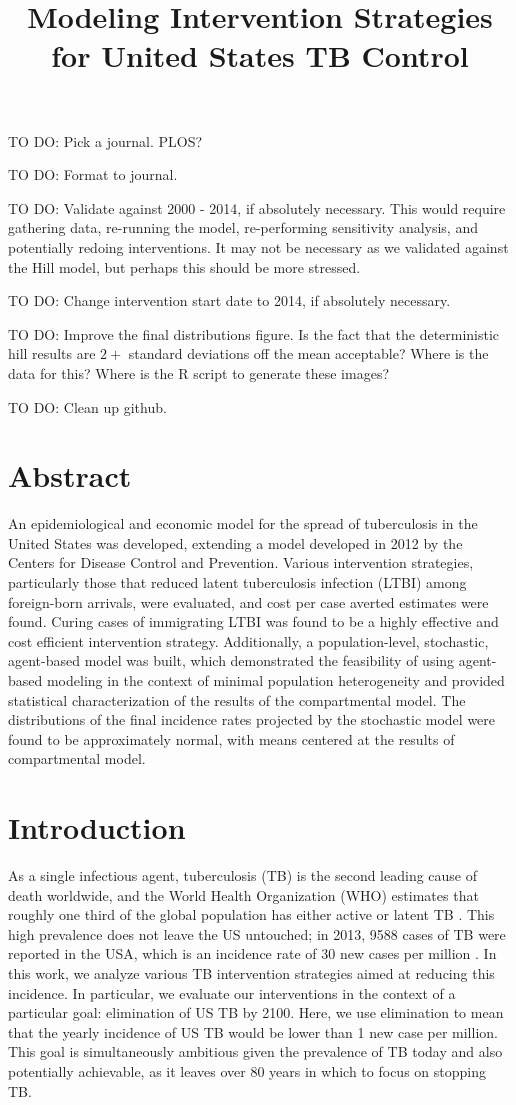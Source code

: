 \documentclass{amsart}
\title{Modeling Intervention Strategies for United States TB Control}
\renewcommand{\(}{\left(}
\renewcommand{\)}{\right)}
\newcommand{\TODO}[1]{\begin{framed}{\huge \color{red} TO DO:}
  #1 \end{framed}}
\begin{document}
\maketitle

\TODO{Pick a journal. PLOS?}
\TODO{Format to journal.}
\TODO{Validate against 2000 - 2014, if absolutely necessary. This would require
gathering data, re-running the model, re-performing sensitivity analysis, and
potentially redoing interventions. It may not be necessary as we validated
against the Hill model, but perhaps this should be more stressed.}
\TODO{Change intervention start date to 2014, if absolutely necessary.}
\TODO{Improve the final distributions figure. Is the fact that the deterministic
  hill results are $2+$ standard deviations off the mean acceptable? Where is
  the data for this? Where is the R script to generate these images?}
\TODO{Clean up github.}

\section{Abstract}
An epidemiological and economic model for the spread of tuberculosis in the
United States was developed, extending a model developed in 2012 by the Centers
for Disease Control and Prevention. Various intervention strategies,
particularly those that reduced latent tuberculosis infection (LTBI) among
foreign-born arrivals, were evaluated, and cost per case averted estimates were
found. Curing cases of immigrating LTBI was found to be a highly effective and
cost efficient intervention strategy. Additionally, a population-level,
stochastic, agent-based model was built, which demonstrated the feasibility of
using agent-based modeling in the context of minimal population heterogeneity
and provided statistical characterization of the results of the compartmental
model. The distributions of the final incidence rates projected by the
stochastic model were found to be approximately normal, with means centered at
the results of compartmental model.  

\section{Introduction}
As a single infectious agent, tuberculosis (TB) is the second leading cause of
death worldwide, and the World Health Organization (WHO) estimates that roughly
one third of the global population has either active or latent TB
\cite{_who_2013}. This high prevalence does not leave the US untouched; in 2013,
9588 cases of TB were reported in the USA, which is an incidence rate of 30 new
cases per million \cite{miramontes_trends_2013}. In this work, we analyze
various TB intervention strategies aimed at reducing this incidence. In
particular, we evaluate our interventions in the context of a particular goal:
elimination of US TB by 2100. Here, we use elimination to mean that the yearly
incidence of US TB would be lower than 1 new case per million. This goal is
simultaneously ambitious given the prevalence of TB today and also potentially
achievable, as it leaves over 80 years in which to focus on stopping TB.
\end{document}
